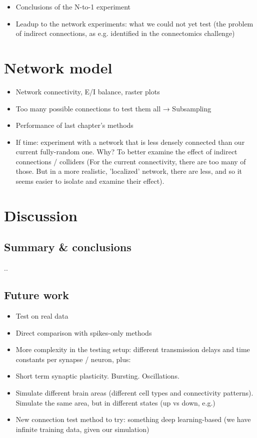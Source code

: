 \documentclass[a4paper, oneside, 11pt]{memoir}
\begin{document}
\begin{itemize}
    \item Conclusions of the N-to-1 experiment
    \item Leadup to the network experiments: what we could not yet test (the problem of indirect connections, as e.g. identified in the connectomics challenge)
\end{itemize}



\chapter{Network model}

\begin{itemize}
    \item Network connectivity, E/I balance, raster plots
    \item Too many possible connections to test them all → Subsampling
    \item Performance of last chapter's methods
    \item If time: experiment with a network that is less densely connected than our current fully-random one. Why? To better examine the effect of indirect connections / colliders (For the current connectivity, there are too many of those. But in a more realistic, 'localized' network, there are less, and so it seems easier to isolate and examine their effect).
\end{itemize}


\chapter{Discussion}

\section{Summary \& conclusions}

..

\section{Future work}

\begin{itemize}
    \item Test on real data
    \item Direct comparison with spikes-only methods
    \item More complexity in the testing setup: different transmission delays and time constants per synapse / neuron, plus:
    \item Short term synaptic plasticity. Bursting. Oscillations.
    \item Simulate different brain areas (different cell types and connectivity patterns). Simulate the same area, but in different states (up vs down, e.g.)
    \item New connection test method to try: something deep learning-based (we have infinite training data, given our simulation)
\end{itemize}
\end{document}
